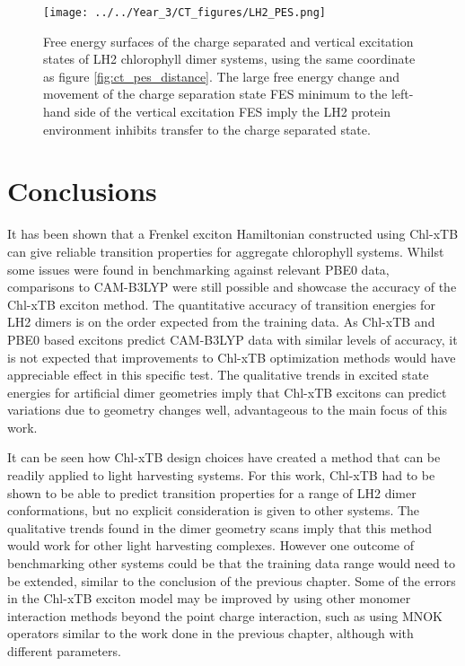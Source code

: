 \begin{figure}
    \centering
    \texttt{[image: ../../Year\_3/CT\_figures/LH2\_PES.png]}
    \caption{Free energy surfaces of the charge separated and vertical excitation
    states of LH2 chlorophyll dimer systems, using the same coordinate as figure
    \ref{fig:ct_pes_distance}. The large free energy change and movement of the 
    charge separation state FES minimum to the left-hand side of the vertical excitation 
    FES imply the LH2 protein environment inhibits transfer to the charge separated
    state.}
    \label{fig:ct_pes_lh2}
\end{figure}

\section{Conclusions}
\label{sec:exciton_concs}

It has been shown that a Frenkel exciton Hamiltonian constructed using Chl-xTB can
give reliable transition properties for aggregate chlorophyll systems. Whilst some
issues were found in benchmarking against relevant PBE0 data, comparisons to CAM-B3LYP 
were still possible and showcase the accuracy of the Chl-xTB exciton method. The
quantitative accuracy of transition energies for LH2 dimers is on the order expected
from the training data. As Chl-xTB and PBE0 based excitons predict CAM-B3LYP data
with similar levels of accuracy, it is not expected that improvements to Chl-xTB
optimization methods would have appreciable effect in this specific test. The qualitative
trends in excited state energies for artificial dimer geometries imply that Chl-xTB 
excitons can predict variations due to geometry changes well, advantageous to the
main focus of this work.

It can be seen how Chl-xTB design choices have created a method that can be readily 
applied to light harvesting systems. For this work, Chl-xTB had to be shown to be 
able to predict transition properties for a range of LH2 dimer conformations, but 
no explicit consideration is given to other systems. The qualitative trends found 
in the dimer geometry scans imply that this method would work for other light harvesting
complexes. However one outcome of benchmarking other systems could be that the training
data range would need to be extended, similar to the conclusion of the previous 
chapter. Some of the errors in the Chl-xTB exciton model may be improved by using
other monomer interaction methods beyond the point charge interaction, such as
using MNOK operators similar to the work done in the previous chapter, although
with different parameters.

